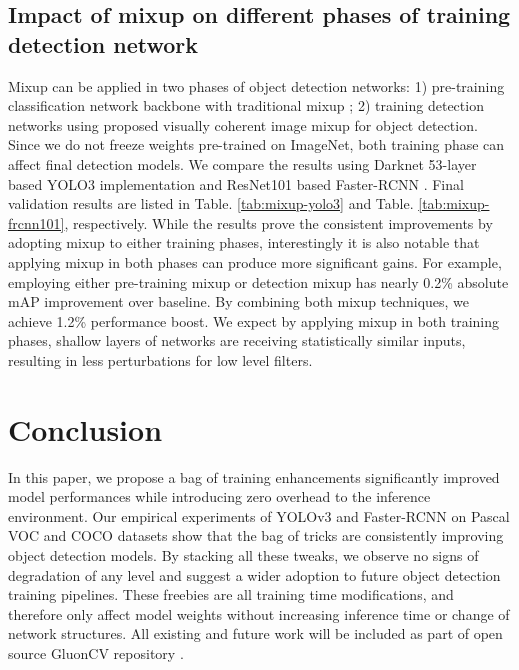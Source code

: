 \documentclass[10pt,twocolumn,letterpaper]{article}
\begin{document}
\subsection{Impact of mixup on different phases of training detection network}
Mixup can be applied in two phases of object detection networks: 1) pre-training classification network backbone with traditional mixup \cite{he2018bag, zhang2017mixup}; 2) training detection networks using proposed visually coherent image mixup for object detection. Since we do not freeze weights pre-trained on ImageNet, both training phase can affect final detection models. We compare the results using Darknet 53-layer based YOLO3 \cite{redmon2018yolov3} implementation and ResNet101 \cite{he2016deep} based Faster-RCNN \cite{ren2015faster}. Final validation results are listed in Table. \ref{tab:mixup-yolo3} and Table. \ref{tab:mixup-frcnn101}, respectively. While the results prove the consistent improvements by adopting mixup to either training phases, interestingly it is also notable that applying mixup in both phases can produce more significant gains. For example, employing either pre-training mixup or detection mixup has nearly 0.2\% absolute mAP improvement over baseline. By combining both mixup techniques, we achieve 1.2\% performance boost. We expect by applying mixup in both training phases, shallow layers of networks are receiving statistically similar inputs, resulting in less perturbations for low level filters. 

\section{Conclusion}
\label{sec:conclusion}

In this paper, we propose a bag of training enhancements significantly improved model performances while introducing zero overhead to the inference environment. Our empirical experiments of YOLOv3 \cite{redmon2018yolov3} and Faster-RCNN \cite{ren2015faster} on Pascal VOC and COCO datasets show that the bag of tricks are consistently improving object detection models. By stacking all these tweaks, we observe no signs of degradation of any level and suggest a wider adoption to future object detection training pipelines. These freebies are all training time modifications, and therefore only affect model weights without increasing inference time or change of network structures. All existing and future work will be included as part of open source GluonCV repository \cite{gluoncv}.

{\small


}
\end{document}
